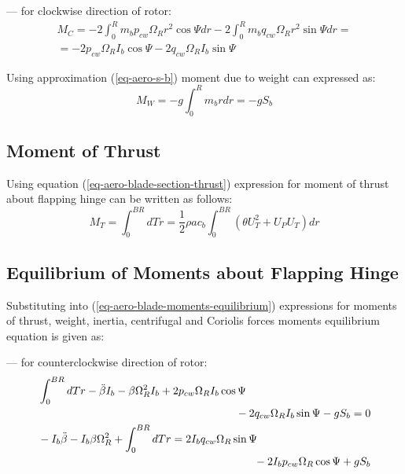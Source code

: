 --- for clockwise direction of rotor:
\begin{multline}
  M_C =
  - 2 \int_{0}^{R} m_b p_{cw} \Omega_R r^2 \cos \Psi dr
  - 2 \int_{0}^{R} m_b q_{cw} \Omega_R r^2 \sin \Psi dr
  = \\ =
  -2 p_{cw} \Omega_R I_b \cos \Psi - 2 q_{cw} \Omega_R I_b \sin \Psi
\end{multline}

Using approximation (\ref{eq-aero-s-b}) moment due to weight can expressed as:
\begin{equation}
  M_W = -g \int_{0}^{R} m_b r dr = -g S_b
\end{equation}

\subsection{Moment of Thrust}

Using equation (\ref{eq-aero-blade-section-thrust}) expression for moment of thrust about flapping hinge can be written as follows:
\begin{equation}
  M_T =
  \int_{0}^{BR} dT r = 
  \frac{1}{2} \rho a c_b
  \int_{0}^{BR} \left( \theta U_T^2 + U_P U_T \right) dr
\end{equation}

\subsection{Equilibrium of Moments about Flapping Hinge}

Substituting into (\ref{eq-aero-blade-moments-equilibrium}) expressions for moments of thrust, weight, inertia, centrifugal and Coriolis forces moments equilibrium equation is given as:

--- for counterclockwise direction of rotor:
\begin{gather}
  \begin{multlined}[0.88\textwidth]
    \int_{0}^{BR} dT r
    - \ddot \beta I_b
    - \beta \Omega_R^2 I_b
    + 2 p_{cw} \Omega_R I_b \cos \Psi \\
    - 2 q_{cw} \Omega_R I_b \sin \Psi
    - g S_b
    = 0
  \end{multlined}
  \\
  \begin{multlined}[0.88\textwidth]
    \label{eq-aero-equilibrium-blade-moments-ccw-1}
    - I_b \ddot \beta
    - I_b \beta \Omega_R^2
    + \int_{0}^{BR} dT r
    = 2 I_b q_{cw} \Omega_R \sin \Psi \\
    - 2 I_b p_{cw} \Omega_R \cos \Psi
    + g S_b
  \end{multlined}
\end{gather}
  
